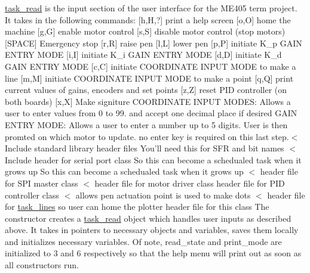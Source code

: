 \hyperlink{classtask__read}{task\-\_\-read} is the input section of the user interface for the M\-E405 term project. It takes in the following commands\-: \mbox{[}h,H,?\mbox{]} print a help screen \mbox{[}o,O\mbox{]} home the machine \mbox{[}g,G\mbox{]} enable motor control \mbox{[}s,S\mbox{]} disable motor control (stop motors) \mbox{[}S\-P\-A\-C\-E\mbox{]} Emergency stop \mbox{[}r,R\mbox{]} raise pen \mbox{[}l,L\mbox{]} lower pen \mbox{[}p,P\mbox{]} initiate K\-\_\-p G\-A\-I\-N E\-N\-T\-R\-Y M\-O\-D\-E \mbox{[}i,I\mbox{]} initiate K\-\_\-i G\-A\-I\-N E\-N\-T\-R\-Y M\-O\-D\-E \mbox{[}d,D\mbox{]} initiate K\-\_\-d G\-A\-I\-N E\-N\-T\-R\-Y M\-O\-D\-E \mbox{[}c,C\mbox{]} initiate C\-O\-O\-R\-D\-I\-N\-A\-T\-E I\-N\-P\-U\-T M\-O\-D\-E to make a line \mbox{[}m,M\mbox{]} initiate C\-O\-O\-R\-D\-I\-N\-A\-T\-E I\-N\-P\-U\-T M\-O\-D\-E to make a point \mbox{[}q,Q\mbox{]} print current values of gains, encoders and set points \mbox{[}z,Z\mbox{]} reset P\-I\-D controller (on both boards) \mbox{[}x,X\mbox{]} Make signiture C\-O\-O\-R\-D\-I\-N\-A\-T\-E I\-N\-P\-U\-T M\-O\-D\-E\-S\-: Allows a user to enter values from 0 to 99. and accept one decimal place if desired G\-A\-I\-N E\-N\-T\-R\-Y M\-O\-D\-E\-: Allows a user to enter a number up to 5 digits. User is then promted on which motor to update. no enter key is required on this last step.$<$ Include standard library header files You'll need this for S\-F\-R and bit names $<$ Include header for serial port class So this can become a schedualed task when it grows up So this can become a schedualed task when it grows up $<$ header file for S\-P\-I master class $<$ header file for motor driver class header file for P\-I\-D controller class $<$ allows pen actuation point is used to make dots $<$ header file for \hyperlink{classtask__lines}{task\-\_\-lines} so user can home the plotter header file for this class The constructor creates a \hyperlink{classtask__read}{task\-\_\-read} object which handles user inputs as described above. It takes in pointers to necessary objects and variables, saves them locally and initializes necessary variables. Of note, read\-\_\-state and print\-\_\-mode are initialized to 3 and 6 respectively so that the help menu will print out as soon as all constructors run. 
